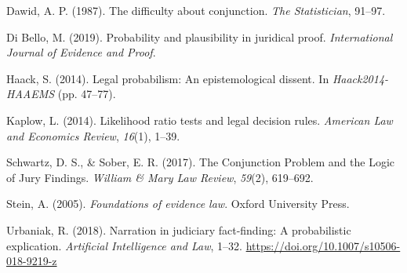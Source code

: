 \documentclass[10pt,dvipsnames,enabledeprecatedfontcommands]{scrartcl}
\begin{document}
\hypertarget{ref-dawid1987difficulty}{}
Dawid, A. P. (1987). The difficulty about conjunction. \emph{The
Statistician}, 91--97.

\hypertarget{ref-DiBello2019plausibility}{}
Di Bello, M. (2019). Probability and plausibility in juridical proof.
\emph{International Journal of Evidence and Proof}.

\hypertarget{ref-haack2011legal}{}
Haack, S. (2014). Legal probabilism: An epistemological dissent. In
\emph{Haack2014-HAAEMS} (pp. 47--77).

\hypertarget{ref-kaplow2014likelihood}{}
Kaplow, L. (2014). Likelihood ratio tests and legal decision rules.
\emph{American Law and Economics Review}, \emph{16}(1), 1--39.

\hypertarget{ref-schwartz2017ConjunctionProblemLogic}{}
Schwartz, D. S., \& Sober, E. R. (2017). The Conjunction Problem and the
Logic of Jury Findings. \emph{William \& Mary Law Review}, \emph{59}(2),
619--692.

\hypertarget{ref-Stein05}{}
Stein, A. (2005). \emph{Foundations of evidence law}. Oxford University
Press.

\hypertarget{ref-urbaniak2018narration}{}
Urbaniak, R. (2018). Narration in judiciary fact-finding: A
probabilistic explication. \emph{Artificial Intelligence and Law},
1--32. \url{https://doi.org/10.1007/s10506-018-9219-z}
\end{document}
